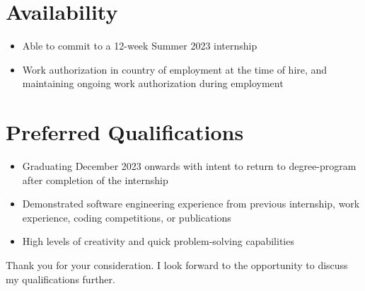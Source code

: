 \documentclass{article}
\begin{document}
\section*{Availability}

\begin{itemize}
\item Able to commit to a 12-week Summer 2023 internship
\item Work authorization in country of employment at the time of hire, and maintaining ongoing work authorization during employment
\end{itemize}

\section*{Preferred Qualifications}

\begin{itemize}
\item Graduating December 2023 onwards with intent to return to degree-program after completion of the internship
\item Demonstrated software engineering experience from previous internship, work experience, coding competitions, or publications
\item High levels of creativity and quick problem-solving capabilities
\end{itemize}

Thank you for your consideration. I look forward to the opportunity to discuss my qualifications further.
\end{document}
